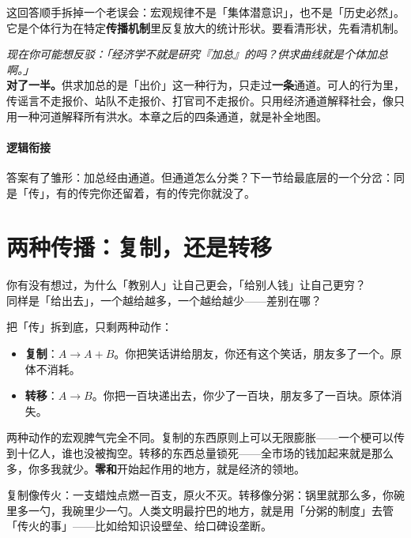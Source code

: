 \documentclass[../../main2.tex]{subfiles}
\begin{document}
这回答顺手拆掉一个老误会：宏观规律不是「集体潜意识」，也不是「历史必然」。它是个体行为在特定\textbf{传播机制}里反复放大的统计形状。要看清形状，先看清机制。

\begin{questionbox}
	\textit{现在你可能想反驳：「经济学不就是研究『加总』的吗？供求曲线就是个体加总啊。」}\\
	\textbf{对了一半。}供求加总的是「出价」这一种行为，只走过\textbf{一条}通道。可人的行为里，传谣言不走报价、站队不走报价、打官司不走报价。只用经济通道解释社会，像只用一种河道解释所有洪水。本章之后的四条通道，就是补全地图。
\end{questionbox}

\paragraph*{逻辑衔接}
	答案有了雏形：加总经由通道。但通道怎么分类？下一节给最底层的一个分岔：同是「传」，有的传完你还留着，有的传完你就没了。

\section{两种传播：复制，还是转移}

\begin{readingnote}
	你有没有想过，为什么「教别人」让自己更会，「给别人钱」让自己更穷？\\
	同样是「给出去」，一个越给越多，一个越给越少——差别在哪？
\end{readingnote}

把「传」拆到底，只剩两种动作：

\begin{itemize}
	\item \textbf{复制}：$A \rightarrow A + B$。你把笑话讲给朋友，你还有这个笑话，朋友多了一个。原体不消耗。
	\item \textbf{转移}：$A \rightarrow B$。你把一百块递出去，你少了一百块，朋友多了一百块。原体消失。
\end{itemize}

两种动作的宏观脾气完全不同。复制的东西原则上可以无限膨胀——一个梗可以传到十亿人，谁也没被掏空。转移的东西总量锁死——全市场的钱加起来就是那么多，你多我就少。\textbf{零和}开始起作用的地方，就是经济的领地。

\begin{tcolorbox}[colback=green!5, title=\textit{生活类比}]
	复制像传火：一支蜡烛点燃一百支，原火不灭。转移像分粥：锅里就那么多，你碗里多一勺，我碗里少一勺。人类文明最拧巴的地方，就是用「分粥的制度」去管「传火的事」——比如给知识设壁垒、给口碑设垄断。
\end{tcolorbox}
\end{document}
